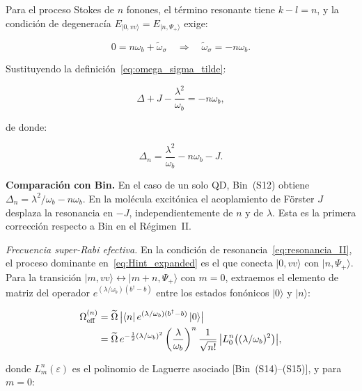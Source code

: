 \documentclass[12pt]{article}
\begin{document}
	Para el proceso Stokes de $n$ fonones, el t\'ermino resonante
	tiene $k - l = n$, y la condici\'on de degenerac\'ia
	$E_{|0,vv\rangle} = E_{|n,\Psi_+\rangle}$ exige:
	
	\begin{equation}
		0 = n\omega_b + \widetilde\omega_\sigma
		\quad\Longrightarrow\quad
		\widetilde\omega_\sigma = -n\omega_b.
	\end{equation}
	
	\noindent
	Sustituyendo la definici\'on~\eqref{eq:omega_sigma_tilde}:
	
	\begin{equation}
		\Delta + J - \frac{\lambda^2}{\omega_b} = -n\omega_b,
	\end{equation}
	
	\noindent
	de donde:
	
	\begin{equation}
		\boxed{
			\Delta_n = \frac{\lambda^2}{\omega_b} - n\omega_b - J.
		}
		\label{eq:resonancia_II}
	\end{equation}
	
	\noindent
	\textbf{Comparaci\'on con Bin.}
	En el caso de un solo QD, Bin~(S12) obtiene
	$\Delta_n = \lambda^2/\omega_b - n\omega_b$. En la mol\'ecula
	excit\'onica el acoplamiento de F\"orster $J$ desplaza la resonancia
	en $-J$, independientemente de $n$ y de $\lambda$. Esta es la
	primera correcci\'on respecto a Bin en el R\'egimen~II.
	
	\medskip
	\noindent
	\textit{Frecuencia super-Rabi efectiva.}
	En la condici\'on de resonancia~\eqref{eq:resonancia_II},
	el proceso dominante en~\eqref{eq:Hint_expanded} es el que conecta
	$|0, vv\rangle$ con $|n, \Psi_+\rangle$. Para la transici\'on
	$|m, vv\rangle \leftrightarrow |m+n, \Psi_+\rangle$ con $m = 0$,
	extraemos el elemento de matriz del operador
	$e^{(\lambda/\omega_b)(b^\dagger - b)}$ entre los estados fon\'onicos
	$|0\rangle$ y $|n\rangle$:
	
	\begin{align}
		\Omega_\mathrm{eff}^{(n)}
		&= \widetilde\Omega\,\bigl|\langle n|\,
		e^{(\lambda/\omega_b)(b^\dagger - b)}\,|0\rangle\bigr|
		\notag\\
		&= \widetilde\Omega\,
		e^{-\frac{1}{2}(\lambda/\omega_b)^2}
		\left(\frac{\lambda}{\omega_b}\right)^n
		\frac{1}{\sqrt{n!}}\,
		\bigl|L_0^n\bigl((\lambda/\omega_b)^2\bigr)\bigr|,
		\label{eq:Oeff_II_general}
	\end{align}
	
	donde $L_m^n(\varepsilon)$ es el polinomio de Laguerre asociado
	[Bin~(S14)--(S15)], y para $m = 0$:
	
\end{document}
